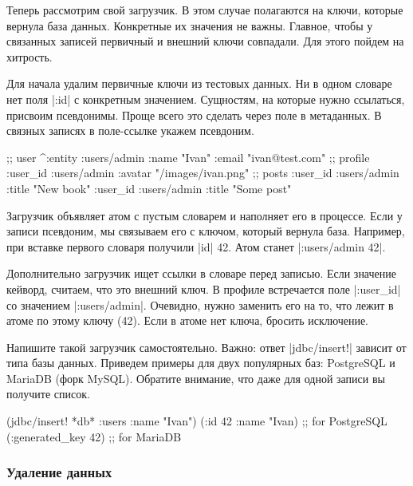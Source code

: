 Теперь рассмотрим свой загрузчик. В этом случае полагаются на ключи, которые
вернула база данных. Конкретные их значения не важны. Главное, чтобы у связанных
записей первичный и внешний ключи совпадали. Для этого пойдем на хитрость.

Для начала удалим первичные ключи из тестовых данных. Ни в одном словаре нет
поля \spverb|:id| с конкретным значением. Сущностям, на которые нужно ссылаться,
присвоим псевдонимы. Проще всего это сделать через поле в метаданных. В связных
записях в поле-ссылке укажем псевдоним.

\begin{english}
  \begin{clojure}
;; user
^{:entity :users/admin} {:name "Ivan" :email "ivan@test.com"}
;; profile
{:user_id :users/admin :avatar "/images/ivan.png"}
;; posts
{:user_id :users/admin :title "New book"}
{:user_id :users/admin :title "Some post"}
  \end{clojure}
\end{english}

Загрузчик объявляет атом с пустым словарем и наполняет его в процессе. Если у
записи псевдоним, мы связываем его с ключом, который вернула база. Например, при
вставке первого словаря получили \spverb|id| 42. Атом станет \spverb|{:users/admin 42}|.

Дополнительно загрузчик ищет ссылки в словаре перед записью. Если значение
кейворд, считаем, что это внешний ключ. В профиле встречается поле
\spverb|:user_id| со значением \spverb|:users/admin|. Очевидно, нужно заменить
его на то, что лежит в атоме по этому ключу (42). Если в атоме нет ключа,
бросить исключение.

Напишите такой загрузчик самостоятельно. Важно: ответ \spverb|jdbc/insert!|
зависит от типа базы данных. Приведем примеры для двух популярных баз:
PostgreSQL и MariaDB (форк MySQL). Обратите внимание, что даже для одной записи
вы получите список.

\begin{english}
  \begin{clojure}
(jdbc/insert! *db* :users {:name "Ivan"})
({:id 42 :name "Ivan}) ;; for PostgreSQL
({:generated_key 42})  ;; for MariaDB
  \end{clojure}
\end{english}

\subsubsection*{Удаление данных}

